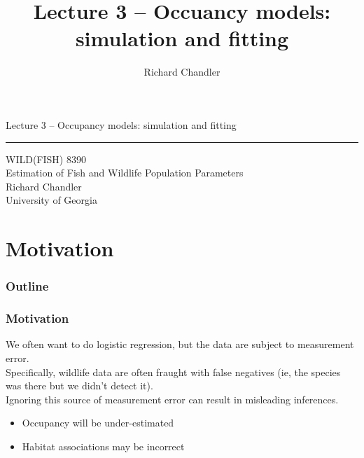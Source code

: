 \documentclass[color=usenames,dvipsnames]{beamer}\usepackage[]{graphicx}\usepackage[]{color}
\title{Lecture 3 -- Occuancy models: simulation and fitting }
\author{Richard Chandler}
\begin{document}
\begin{frame}[plain]
  \LARGE
  \centering
  {\huge Lecture 3 -- Occupancy models: simulation and fitting} \\
  {\color{default} \rule{\textwidth}{0.1pt}}
  \vfill
  \large
  WILD(FISH) 8390 \\
  Estimation of Fish and Wildlife Population Parameters \\
  \vfill
  \large
  Richard Chandler \\
  University of Georgia \\
\end{frame}






\section{Motivation}



\begin{frame}[plain]
  \frametitle{Outline}
  \Large
\end{frame}



\begin{frame}
  \frametitle{Motivation}
  We often want to do logistic regression, but the data are subject
  to measurement error. \\  
  \pause
  \vfill
  Specifically, wildlife data are often fraught with false negatives
  (ie, the species was there but we didn't detect it). \\
  \pause
  \vfill
  Ignoring this source of measurement error can result in misleading
  inferences. \\
  \begin{itemize}
    \item Occupancy will be under-estimated
    \item Habitat associations may be incorrect
  \end{itemize}
\end{frame}


\end{document}

